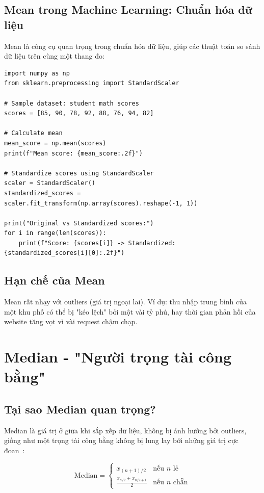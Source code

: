 \subsection{Mean trong Machine Learning: Chuẩn hóa dữ liệu}

Mean là công cụ quan trọng trong chuẩn hóa dữ liệu, giúp các thuật toán so sánh dữ liệu trên cùng một thang đo:

\begin{lstlisting}[caption={Feature scaling using Mean},label={lst:mean-scaling}]
import numpy as np
from sklearn.preprocessing import StandardScaler

# Sample dataset: student math scores
scores = [85, 90, 78, 92, 88, 76, 94, 82]

# Calculate mean
mean_score = np.mean(scores)
print(f"Mean score: {mean_score:.2f}")

# Standardize scores using StandardScaler
scaler = StandardScaler()
standardized_scores = scaler.fit_transform(np.array(scores).reshape(-1, 1))

print("Original vs Standardized scores:")
for i in range(len(scores)):
    print(f"Score: {scores[i]} -> Standardized: {standardized_scores[i][0]:.2f}")
\end{lstlisting}

\subsection{Hạn chế của Mean}

Mean rất nhạy với outliers (giá trị ngoại lai). Ví dụ: thu nhập trung bình của một khu phố có thể bị "kéo lệch" bởi một vài tỷ phú, hay thời gian phản hồi của website tăng vọt vì vài request chậm chạp.

\section{Median - "Người trọng tài công bằng"}

\subsection{Tại sao Median quan trọng?}

Median là giá trị ở giữa khi sắp xếp dữ liệu, không bị ảnh hưởng bởi outliers, giống như một trọng tài công bằng không bị lung lay bởi những giá trị cực đoan~\cite{datacamp2025}:

\[
\text{Median} = \begin{cases}
x_{(n+1)/2} & \text{nếu } n \text{ lẻ} \\
\frac{x_{n/2} + x_{n/2+1}}{2} & \text{nếu } n \text{ chẵn}
\end{cases}
\]

